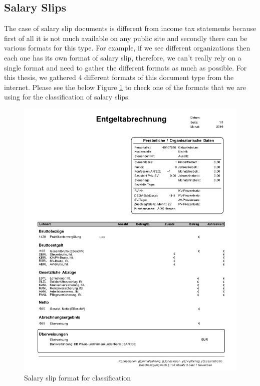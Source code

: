 \subsection{Salary Slips}
The case of salary slip documents is different from income tax statements because first of all it is not much available on any public site and secondly there can be various formats for this type. For example, if we see different organizations then each one has its own format of salary slip, therefore, we can't really rely on a single format and need to gather the different formats as much as possible. For this thesis, we gathered 4 different formats of this document type from the internet. Please see the below Figure \ref{ga_formats} to check one of the formats that we are using for the classification of salary slips.
\begin{figure}[H]
\centering
\includegraphics[scale=0.8]{images/Chapter3/ga-format-1.png}
\caption{Salary slip format for classification}
\label{ga_formats}
\end{figure}
\par
